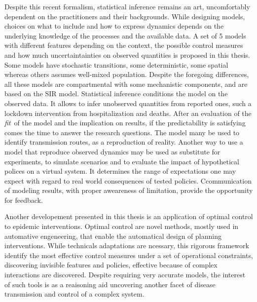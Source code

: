 Despite this recent formalism, statistical inference remains an art, uncomfortably dependent on the practitioners and their backgrounds. While designing models, choices on what to include and how to express dynamics depends on the underlying knowledge of the processes and the available data. A set of 5 models with different features depending on the context, the possible control measures and how much uncertaintainties on observed quantities is proposed in this thesis.  Some models have stochastic transitions, some deterministic, some spatial whereas others assumes well-mixed population. Despite the foregoing differences, all these models are compartmental with some mechanistic components, and are based on the SIR model. 
Statistical inference conditions the model on the observed data. It allows to infer unobserved quantities from reported ones, such a lockdown intervention from hospitalization and deaths. After an evaluation of the \textit{fit} of the model and the implication on results, if the predictability is satisfying comes the time to answer the research questions. The model many be used to identify transmission routes, as a reproduction of reality. Another way to use a model that reproduce observed dynamics may be used as substitute for experiments, to simulate scenarios and to evaluate the impact of hypothetical polices on a virtual system. It determines the range of expectations one may expect with regard to real world consequences of tested policies. Ccommunication of modeling results, with proper aweareness of limitation, provide the opportunity for feedback.

Another developement presented in this thesis is an application of optimal control to epidemic interventions. Optimal control are novel methods, mostly used in automative engeneering, that enable the automatical design of planning interventions. While technicals adaptations are ncessary, this rigorous framework identify the most effective control measures under a set of operational constraints, discovering invisible features and policies, effective because of complex interactions are discovered. Despite requiring very accurate models, the interest of such tools is as a reaisoning aid uncovering another facet of disease transmission and control of a complex system.

